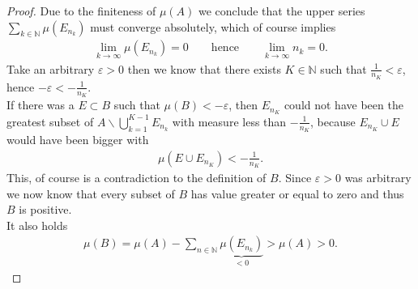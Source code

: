 \documentclass[11pt,a4paper]{article}
\begin{document}
\begin{proof}
Due to the finiteness of $\mu(A)$ we conclude that the upper series $\sum\limits_{k\in\mathbb{N}}\mu(E_{n_k})$ must converge absolutely, which of course implies 
\begin{align*}
\lim\limits_{k\rightarrow\infty}\mu(E_{n_k}) = 0\qquad \text{hence}\qquad\lim\limits_{k\rightarrow\infty}n_k = 0.
\end{align*}
Take an arbitrary $\varepsilon>0$ then we know that there exists $K\in\mathbb{N}$ such that $\frac{1}{n_K}<\varepsilon$, hence $-\varepsilon<-\frac{1}{n_K}$. \vspace{1.5em}\\If there was a $E\subset{}B$ such that $\mu(B)<-\varepsilon$, then $E_{n_K}$ could not have been the greatest subset of $A\backslash\bigcup\limits_{k=1}^{K-1}E_{n_k}$ with measure less than $-\frac{1}{n_K}$, because $E_{n_K}\cup{}E$ would have been bigger with
\begin{align*}
\mu(E\cup{}E_{n_K}) < -\frac{1}{n_K}.
\end{align*} 
This, of course is a contradiction to the definition of $B$. Since $\varepsilon>0$ was arbitrary we now know that every subset of $B$ has value greater or equal to zero and thus $B$ is positive. \vspace{1em}\\
It also holds 
\begin{align*}
\mu(B) = \mu(A)-\sum\limits_{n\in\mathbb{N}}\underbrace{\mu(E_{n_k})}_{<0} > \mu(A) > 0.
\end{align*}
\end{proof}
\end{document}
